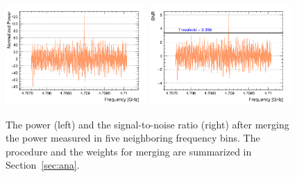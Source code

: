 \begin{figure}[htbp]                                                                                                  
    \centering                                                                                                                       
    \includegraphics[width=0.48\textwidth]{figures/Power_GrandSpectrum_FaxionRun_AllSteps_Rescan_Merged_5bin_SG4_W201_LqWeight.png}
    \includegraphics[width=0.48\textwidth]{figures/SNR_GrandSpectrum_FaxionRun_AllSteps_Rescan_Merged_5bin_SG4_W201_LqWeight.png}
    \caption{The power (left) and the signal-to-noise ratio (right) after merging the power measured in five 
neighboring frequency bins. The procedure and the weights for merging 
are summarized in Section~\ref{sec:ana}.}                
\label{fig:faxionmerge}    
\end{figure}                       

   
